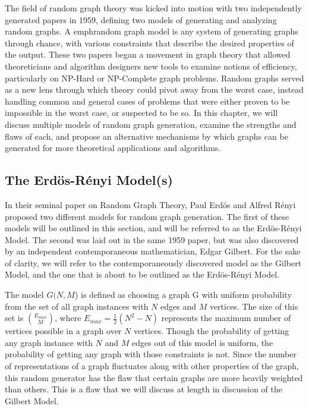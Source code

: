\documentclass[11pt,a4paper]{report}
\begin{document}
The field of random graph theory was kicked into motion with two independently generated papers in 1959, defining two models of generating and analyzing random graphs.
A emph{random graph model} is any system of generating graphs through chance, with various constraints that describe the desired properties of the output.
These two papers began a movement in graph theory that allowed theoreticians and algorithm designers new tools to examine notions of efficiency, particularly on NP-Hard or NP-Complete graph problems.
Random graphs served as a new lens through which theory could pivot away from the worst case, instead handling common and general cases of problems that were either proven to be impossible in the worst case, or suspected to be so. 
In this chapter, we will discuss multiple models of random graph generation, examine the strengths and flaws of each, and propose an alternative mechanisms by which graphs can be generated for more theoretical applications and algorithms.

\subsection{The Erd\"os-R\'enyi Model(s)}

In their seminal paper on Random Graph Theory, Paul Erd\"os and Alfred R\'enyi proposed two different models for random graph generation.
The first of these models will be outlined in this section, and will be referred to as the Erd\"os-R\'enyi Model.
The second was laid out in the same 1959 paper, but was also discovered by an independent contemporaneous mathematician, Edgar Gilbert.
For the sake of clarity, we will refer to the contemporaneously discovered model as the Gilbert Model, and the one that is about to be outlined as the Erd\"os-R\'enyi Model.

The model $G(N, M$) is defined as choosing a graph G with uniform probability from the set of all graph instances with $N$ edges and $M$ vertices.
The size of this set is $\binom{E_{max}}{M}$, where $E_{max} = \frac{1}{2}(N^2 - N)$ represents the maximum number of vertices possible in a graph over $N$ vertices.
Though the probability of getting any graph instance with $N$ and $M$ edges out of this model is uniform, the probability of getting any graph with those constraints is not.
Since the number of representations of a graph fluctuates along with other properties of the graph, this random generator has the flaw that certain graphs are more heavily weighted than others.
This is a flaw that we will discuss at length in discussion of the Gilbert Model.
\end{document}
